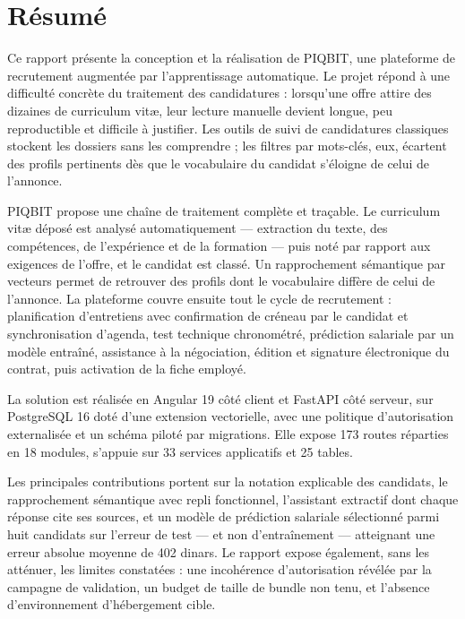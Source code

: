 %
\chapter*{Résumé}

Ce rapport présente la conception et la réalisation de PIQBIT, une plateforme
de recrutement augmentée par l'apprentissage automatique. Le projet répond à
une difficulté concrète du traitement des candidatures : lorsqu'une offre
attire des dizaines de curriculum vitæ, leur lecture manuelle devient longue,
peu reproductible et difficile à justifier. Les outils de suivi de candidatures
classiques stockent les dossiers sans les comprendre ; les filtres par
mots-clés, eux, écartent des profils pertinents dès que le vocabulaire du
candidat s'éloigne de celui de l'annonce.

PIQBIT propose une chaîne de traitement complète et traçable. Le curriculum
vitæ déposé est analysé automatiquement — extraction du texte, des compétences,
de l'expérience et de la formation — puis noté par rapport aux exigences de
l'offre, et le candidat est classé. Un rapprochement sémantique par vecteurs
permet de retrouver des profils dont le vocabulaire diffère de celui de
l'annonce. La plateforme couvre ensuite tout le cycle de recrutement :
planification d'entretiens avec confirmation de créneau par le candidat et
synchronisation d'agenda, test technique chronométré, prédiction salariale par
un modèle entraîné, assistance à la négociation, édition et signature
électronique du contrat, puis activation de la fiche employé.

La solution est réalisée en Angular 19 côté client et FastAPI côté serveur,
sur PostgreSQL 16 doté d'une extension vectorielle, avec une politique
d'autorisation externalisée et un schéma piloté par migrations. Elle expose
173 routes réparties en 18 modules, s'appuie sur 33 services applicatifs et
25 tables.

Les principales contributions portent sur la notation explicable des
candidats, le rapprochement sémantique avec repli fonctionnel, l'assistant
extractif dont chaque réponse cite ses sources, et un modèle de prédiction
salariale sélectionné parmi huit candidats sur l'erreur de test — et non
d'entraînement — atteignant une erreur absolue moyenne de 402 dinars. Le
rapport expose également, sans les atténuer, les limites constatées : une
incohérence d'autorisation révélée par la campagne de validation, un budget de
taille de bundle non tenu, et l'absence d'environnement d'hébergement cible.

